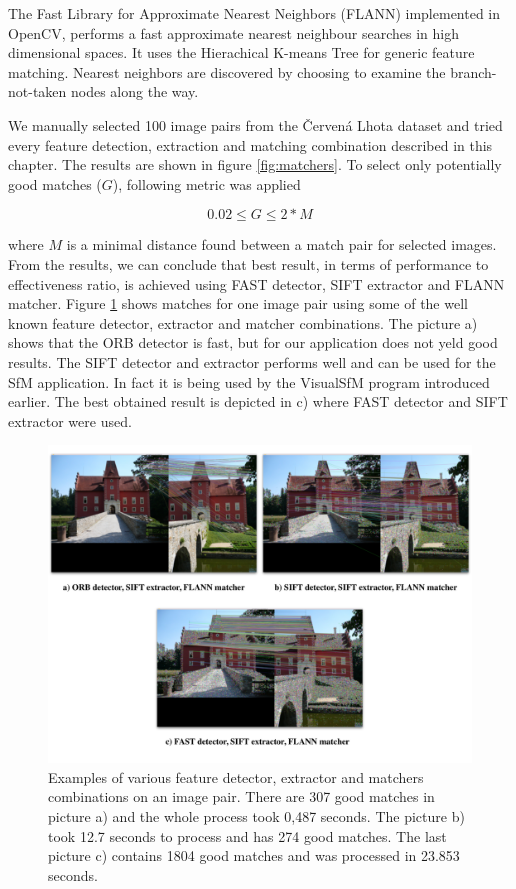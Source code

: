 The Fast Library for Approximate Nearest Neighbors (FLANN) implemented in OpenCV, performs a fast approximate nearest neighbour searches in high dimensional spaces. It uses the Hierachical K-means Tree for generic feature matching. Nearest neighbors are discovered by choosing to examine the branch-not-taken nodes along the way. \cite{www:flann}

We manually selected 100 image pairs from the Červená Lhota dataset and tried every feature detection, extraction and matching combination described in this chapter. The results are shown in figure \ref{fig:matchers}. To select only potentially good matches ($G$), following metric was applied

\begin{equation}
	0.02 \leq G \leq 2* M
\end{equation}

where $M$ is a minimal distance found between a match pair for selected images. From the results, we can conclude that best result, in terms of performance to effectiveness ratio, is achieved using FAST detector, SIFT extractor and FLANN matcher. Figure \ref{fig:matches} shows matches for one image pair using some of the well known feature detector, extractor and matcher combinations. The picture a) shows that the ORB detector is fast, but for our application does not yeld good results. The SIFT detector and extractor performs well and can be used for the SfM application. In fact it is being used by the VisualSfM program introduced earlier. The best obtained result is depicted in c) where FAST detector and SIFT extractor were used.

\begin{figure}[ht]
	\begin{center}
		\includegraphics[keepaspectratio,width=\textwidth]{fig/matches.pdf}
	\end{center}
	\caption{Examples of various feature detector, extractor and matchers combinations on an image pair. There are 307 good matches in picture a) and the whole process took 0,487 seconds. The picture b) took 12.7 seconds to process and has 274 good matches. The last picture c) contains 1804 good matches and was processed in 23.853 seconds.}
	\label{fig:matches}
\end{figure}

